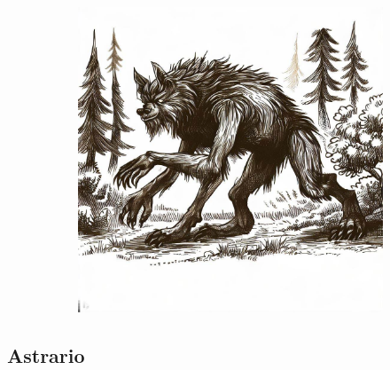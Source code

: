 \documentclass[11pt, twoside]{article}
\begin{document}
\begin{figure}[H]
\begin{subfigure}{0.3\textwidth}
  \end{subfigure}%
  \begin{subfigure}{0.3\textwidth}
    \centering
    \includegraphics[width=0.99\linewidth]{wolf3.jpeg}
  \end{subfigure}
\end{figure}

\newpage

\subsection{Astrario}
\label{sec:orgd2418e1}
\end{document}
